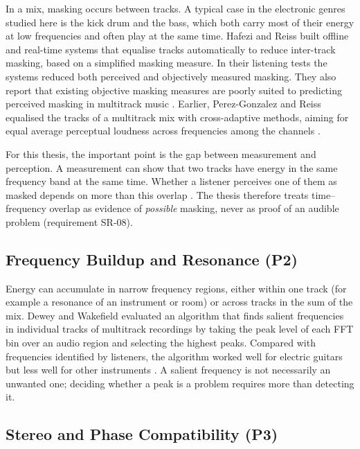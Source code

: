 In a mix, masking occurs between tracks. A typical case in the electronic genres studied here is the kick drum and the bass, which both carry most of their energy at low frequencies and often play at the same time. Hafezi and Reiss built offline and real-time systems that equalise tracks automatically to reduce inter-track masking, based on a simplified masking measure. In their listening tests the systems reduced both perceived and objectively measured masking. They also report that existing objective masking measures are poorly suited to predicting perceived masking in multitrack music \cite{Hafezi2015}. Earlier, Perez-Gonzalez and Reiss equalised the tracks of a multitrack mix with cross-adaptive methods, aiming for equal average perceptual loudness across frequencies among the channels \cite{PerezGonzalez2009EQ}.

For this thesis, the important point is the gap between measurement and perception. A measurement can show that two tracks have energy in the same frequency band at the same time. Whether a listener perceives one of them as masked depends on more than this overlap \cite{Moore2012, Hafezi2015}. The thesis therefore treats time--frequency overlap as evidence of \emph{possible} masking, never as proof of an audible problem (requirement SR-08).

\subsection{Frequency Buildup and Resonance (P2)}
\label{sec:bg-buildup}

Energy can accumulate in narrow frequency regions, either within one track (for example a resonance of an instrument or room) or across tracks in the sum of the mix. Dewey and Wakefield evaluated an algorithm that finds salient frequencies in individual tracks of multitrack recordings by taking the peak level of each \ac{FFT} bin over an audio region and selecting the highest peaks. Compared with frequencies identified by listeners, the algorithm worked well for electric guitars but less well for other instruments \cite{Dewey2015}. A salient frequency is not necessarily an unwanted one; deciding whether a peak is a problem requires more than detecting it.


\subsection{Stereo and Phase Compatibility (P3)}
\label{sec:bg-stereo}

